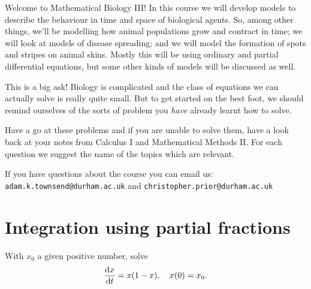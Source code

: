 \documentclass[a4paper,12pt]{article}
\begin{document}
 
%
Welcome to Mathematical Biology III! In this course we will develop models to describe the behaviour in time and space of biological agents. So, among other things, we'll be modelling how animal populations grow and contract in time; we will look at models of disease spreading; and we will model the formation of spots and stripes on animal skins. Mostly this will be using ordinary and partial differential equations, but some other kinds of models will be discussed as well.

This is a big ask! Biology is complicated and the class of equations we can actually solve is really quite small. But to get started on the best foot, we should remind ourselves of the sorts of problem you \emph{have} already learnt how to solve.

Have a go at these problems and if you are unable to solve them, have a look back at your notes from Calculus I and Mathematical Methods II. For each question we suggest the name of the topics which are relevant.

If you have questions about the course you can email us: \texttt{adam.k.townsend@durham.ac.uk} and \texttt{christopher.prior@durham.ac.uk}

\section{Integration using partial fractions}
    With $x_0$ a given positive number, solve
    \begin{equation*}
        \fd{x}{t} = x(1-x), \quad x(0)=x_0.
    \end{equation*}
\end{document}
